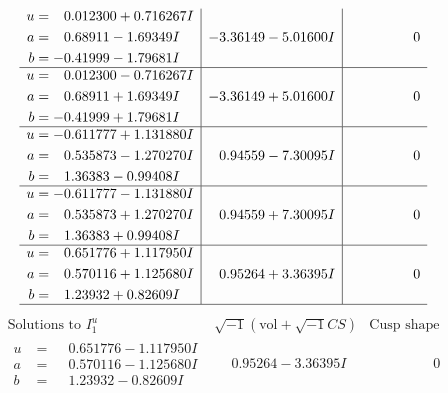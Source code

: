 \documentclass[1p]{elsarticle_modified}
\theoremstyle{definition}
\newcommand{\I}{\sqrt{-1}}
\begin{document}
$$\begin{array}{c|c|c}
\begin{aligned}
u &= \phantom{-}0.012300 + 0.716267 I \\
a &= \phantom{-}0.68911 - 1.69349 I \\
b &= -0.41999 - 1.79681 I\end{aligned}
 & -3.36149 - 5.01600 I & \phantom{-0.000000 } 0 \\ \hline\begin{aligned}
u &= \phantom{-}0.012300 - 0.716267 I \\
a &= \phantom{-}0.68911 + 1.69349 I \\
b &= -0.41999 + 1.79681 I\end{aligned}
 & -3.36149 + 5.01600 I & \phantom{-0.000000 } 0 \\ \hline\begin{aligned}
u &= -0.611777 + 1.131880 I \\
a &= \phantom{-}0.535873 - 1.270270 I \\
b &= \phantom{-}1.36383 - 0.99408 I\end{aligned}
 & \phantom{-}0.94559 - 7.30095 I & \phantom{-0.000000 } 0 \\ \hline\begin{aligned}
u &= -0.611777 - 1.131880 I \\
a &= \phantom{-}0.535873 + 1.270270 I \\
b &= \phantom{-}1.36383 + 0.99408 I\end{aligned}
 & \phantom{-}0.94559 + 7.30095 I & \phantom{-0.000000 } 0 \\ \hline\begin{aligned}
u &= \phantom{-}0.651776 + 1.117950 I \\
a &= \phantom{-}0.570116 + 1.125680 I \\
b &= \phantom{-}1.23932 + 0.82609 I\end{aligned}
 & \phantom{-}0.95264 + 3.36395 I & \phantom{-0.000000 } 0\\
 \hline 
 \end{array}$$\newpage$$\begin{array}{c|c|c}  
\text{Solutions to }I^u_{1}& \I (\text{vol} + \sqrt{-1}CS) & \text{Cusp shape}\\
 \hline 
\begin{aligned}
u &= \phantom{-}0.651776 - 1.117950 I \\
a &= \phantom{-}0.570116 - 1.125680 I \\
b &= \phantom{-}1.23932 - 0.82609 I\end{aligned}
 & \phantom{-}0.95264 - 3.36395 I & \phantom{-0.000000 } 0 \\ \hline\begin{aligned}

\end{aligned}
\end{array}$$
\end{document}
